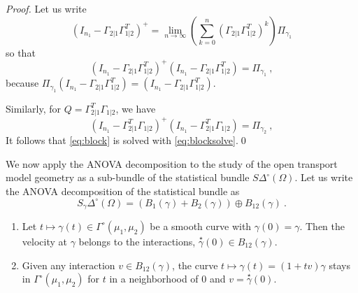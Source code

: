 \documentclass[runningheads]{llncs}
\newcommand{\velocity}[1]{\overset{\star}{#1}}
\begin{document}
\begin{proof}
  Let us write
\begin{equation*}
  (I_{n_1}-\Gamma_{2|1}\Gamma_{1|2}^T)^{+} = \lim_{n\to\infty} \left(\sum_{k=0}^n (\Gamma_{2|1}\Gamma_{1|2}^T)^k\right) \Pi_{\gamma_1}  
\end{equation*}
so that
\begin{equation*}
  (I_{n_1}-\Gamma_{2|1}\Gamma_{1|2}^T)^{+}(I_{n_1}-\Gamma_{2|1}\Gamma_{1|2}^T) = \Pi_{\gamma_1} \ ,
\end{equation*}
because $\Pi_{\gamma_1} (I_{n_1}-\Gamma_{2|1}\Gamma_{1|2}^T) = (I_{n_1}-\Gamma_{2|1}\Gamma_{1|2}^T)$.

Similarly, for $Q = \Gamma_{2|1}^T\Gamma_{1|2}$, we have
\begin{equation*}
  (I_{n_1}-\Gamma_{2|1}^T\Gamma_{1|2})^{+}(I_{n_1}-\Gamma_{2|1}^T\Gamma_{1|2}) = \Pi_{\gamma_2} \ ,
\end{equation*}
It follows that \cref{eq:block} is solved with \cref{eq:blocksolve}.\qed
\end{proof}

We now apply the ANOVA decomposition to the study of the open transport model geometry as a sub-bundle of the statistical bundle $S\Delta^\circ(\Omega)$. Let us write the ANOVA decomposition of the statistical bundle as
  \begin{equation*}
    S_\gamma \Delta^\circ(\Omega) = (B_1(\gamma) + B_2(\gamma)) \oplus B_{12}(\gamma) \ .
  \end{equation*}
 

  \begin{proposition} \begin{enumerate}\item Let $t \mapsto \gamma(t) \in \Gamma^\circ(\mu_1,\mu_2)$ be a smooth curve with $\gamma(0)=\gamma$.   Then the velocity at $\gamma$ belongs to the interactions, $\velocity \gamma(0) \in B_{12}(\gamma)$.
      \item Given any interaction $v \in B_{12}(\gamma)$, the curve $t \mapsto \gamma(t) = (1+tv)\gamma$ stays in $\Gamma^\circ(\mu_1,\mu_2)$ for $t$ in a neighborhood of 0 and $v = \velocity\gamma(0)$.
  \end{enumerate}
\end{proposition}
\end{document}
